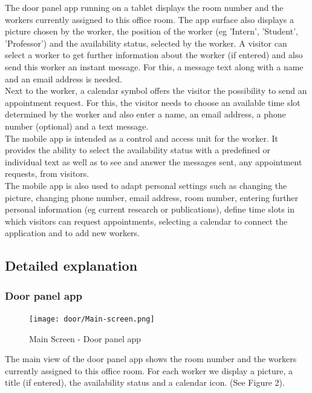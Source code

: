 \documentclass[article,colorback,accentcolor=tud4c, 11pt]{tudreport}
\begin{document}
The door panel app running on a tablet displays the room number and the workers currently assigned to this office room. The app surface also displays a picture chosen by the worker, the position of the worker (eg 'Intern', 'Student', 'Professor') and the availability status, selected by the worker.
A visitor can select a worker to get further information about the worker (if entered) and also send this worker an instant message. For this, a message text along with a name and an email address is needed.\\

Next to the worker, a calendar symbol offers the visitor the possibility to send an appointment request. For this, the visitor needs to choose an available time slot determined by the worker and also enter a name, an email address, a phone number (optional) and a text message.\\

The mobile app is intended as a control and access unit for the worker. It provides the ability to select the availability status with a predefined or individual text as well as to see and answer the messages sent, any appointment requests, from visitors. \\

The mobile app is also used to adapt personal settings such as changing the picture, changing phone number, email address, room number, entering further personal information (eg current research or publications), define time slots in which visitors can request appointments, selecting a calendar to connect the application and to add new workers.
	
\subsection{Detailed explanation}

\subsubsection{Door panel app}

	\begin{figure}
		\centering
		\texttt{[image: door/Main-screen.png]}
		\caption{Main Screen - Door panel app}
	\end{figure}
	
The main view of the door panel app shows the room number and the workers currently assigned to this office room. For each worker we display a picture, a title (if entered), the availability status and a calendar icon. (See Figure 2).\\
\end{document}
